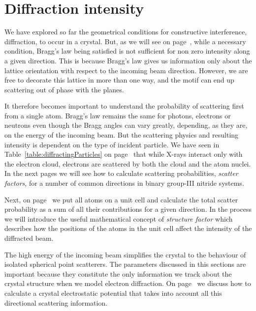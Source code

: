\pagebreak

\section{Diffraction intensity}
\label{sec:intensity}


We have explored so far the geometrical conditions for constructive interference, \ie diffraction, to occur in a crystal.  But, as we will see on page~\pageref{sec:strucFact}, while a necessary condition, Bragg's law being satisfied is not sufficient for non zero intensity along a given direction. This is because Bragg's law gives us information only about the lattice orientation with respect to the incoming beam direction. However, we are free to decorate this lattice in more than one way, and the motif can end up scattering out of phase with the planes.  

It therefore becomes important to understand the probability of scattering first from a single atom. Bragg's law remains the same for photons, electrons or neutrons even though the Bragg angles can vary greatly, depending, as they are, on the energy of the incoming beam. But the scattering physics and resulting intensity is dependent on the type of incident particle. We have seen in Table~\ref{table:diffractingParticles} on page~\pageref{table:diffractingParticles} that while X-rays interact only with the electron cloud, electrons are scattered by both the cloud and the atom nuclei. In the next pages we will see how to calculate scattering probabilities, \ie \textit{scatter factors},  for a number of common directions in binary group-III nitride systems. 

Next, on page~\pageref{sec:strucFact} we put all atoms on a unit cell and calculate the total scatter probability  as a sum of all their contributions for a given direction. In the process we will introduce the useful mathematical concept of \textit{structure factor} which describes how the positions of the atoms in the unit cell affect the intensity of the diffracted beam. 

 The high energy of the incoming beam simplifies the crystal to the behaviour of isolated spherical point scatterers. The parameters discussed in this sections are important because they constitute the only information we track about the crystal structure when we model electron diffraction. On page~\pageref{sec:ICpotential} we discuss how to calculate a crystal electrostatic potential that takes into account all this directional scattering information. 
 
